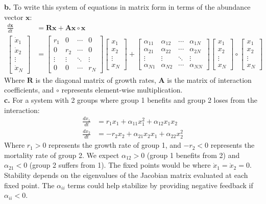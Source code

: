 \documentclass{article}
\begin{document}
\textbf{b. }To write this system of equations in matrix form in terms of the abundance vector $\mathbf{x}$:
\begin{align*}
\frac{d\mathbf{x}}{dt} &= \mathbf{R} \mathbf{x} + \mathbf{A} \mathbf{x} \circ \mathbf{x} \\
\begin{bmatrix} \dot{x}_1 \\ \dot{x}_2 \\ \vdots \\ \dot{x}_N \end{bmatrix} &= \begin{bmatrix} r_1 & 0 & \cdots & 0 \\ 0 & r_2 & \cdots & 0 \\ \vdots & \vdots & \ddots & \vdots \\ 0 & 0 & \cdots & r_N \end{bmatrix} \begin{bmatrix} x_1 \\ x_2 \\ \vdots \\ x_N \end{bmatrix} + \begin{bmatrix} \alpha_{11} & \alpha_{12} & \cdots & \alpha_{1N} \\ \alpha_{21} & \alpha_{22} & \cdots & \alpha_{2N} \\ \vdots & \vdots & \ddots & \vdots \\ \alpha_{N1} & \alpha_{N2} & \cdots & \alpha_{NN} \end{bmatrix} \begin{bmatrix} x_1 \\ x_2 \\ \vdots \\ x_N \end{bmatrix} \circ \begin{bmatrix} x_1 \\ x_2 \\ \vdots \\ x_N \end{bmatrix}
\end{align*}
Where $\mathbf{R}$ is the diagonal matrix of growth rates, $\mathbf{A}$ is the matrix of interaction coefficients, and $\circ$ represents element-wise multiplication.\\

\textbf{c.} For a system with 2 groups where group 1 benefits and group 2 loses from the interaction:
\begin{align*}
\frac{dx_1}{dt} &= r_1 x_1 + \alpha_{11} x_1^2 + \alpha_{12} x_1 x_2 \\
\frac{dx_2}{dt} &= -r_2 x_2 + \alpha_{21} x_2 x_1 + \alpha_{22} x_2^2
\end{align*}
Where $r_1 > 0$ represents the growth rate of group 1, and $-r_2 < 0$ represents the mortality rate of group 2. We expect $\alpha_{12} > 0$ (group 1 benefits from 2) and $\alpha_{21} < 0$ (group 2 suffers from 1). The fixed points would be where $\dot{x}_1 = \dot{x}_2 = 0$. Stability depends on the eigenvalues of the Jacobian matrix evaluated at each fixed point. The $\alpha_{ii}$ terms could help stabilize by providing negative feedback if $\alpha_{ii} < 0$.\\
\end{document}
